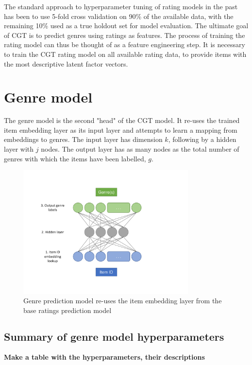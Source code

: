 The standard approach to hyperparameter tuning of rating models in the past has been to use 5-fold cross validation on 90\% of the available data, with the remaining 10\% used as a true holdout set for model evaluation. The ultimate goal of CGT is to predict genres using ratings as features. The process of training the rating model can thus be thought of as a feature engineering step. It is necessary to train the CGT rating model on all available rating data, to provide items with the most descriptive latent factor vectors.

\section{Genre model}
The genre model is the second "head" of the CGT model. It re-uses the trained item embedding layer as its input layer and attempts to learn a mapping from embeddings to genres. The input layer has dimension $k$, following by a hidden layer with $j$ nodes. The output layer has as many nodes as the total number of genres with which the items have been labelled, $g$.

\begin{figure}[H]
\centering
\includegraphics[width=0.8\textwidth]{Figures/4_genre-model.pdf}
\decoRule
\caption[Genre prediction model]{Genre prediction model re-uses the item embedding layer from the base ratings prediction model}
\label{fig:4_genre-prediction-architecture}
\end{figure}

\subsection{Summary of genre model hyperparameters}
\textbf{Make a table with the hyperparameters, their descriptions}